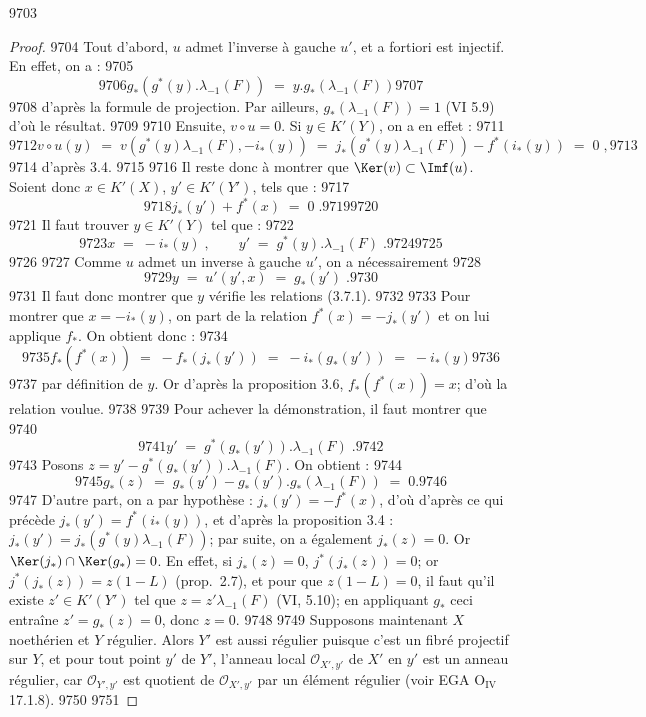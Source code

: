   9703	\begin{proof}
  9704	Tout d'abord, $u$ admet l'inverse à gauche $u'$, et a fortiori est injectif. En effet, on a :
  9705	\[
  9706	g_*(g^*(y).\lambda_{-1}(F)) \; = \; y . g_*(\lambda_{-1}(F))
  9707	\]
  9708	d'après la formule de projection. Par ailleurs, $g_*(\lambda_{-1}(F)) = 1$ (VI 5.9) d'où le résultat.
  9709	
  9710	Ensuite, $v \circ u = 0$. Si $y \in K'(Y)$, on a en effet :
  9711	\[
  9712	v \circ u(y) \; = \; v(g^*(y)\lambda_{-1}(F), -i_*(y)) \; = \; j_*(g^*(y)\lambda_{-1}(F)) - f^*(i_*(y)) \; = \; 0\; ,
  9713	\]
  9714	d'après 3.4.
  9715	
  9716	Il reste donc à montrer que $\Ker(v) \subset \Imf(u)$. Soient donc $x \in K'(X)$, $y' \in K'(Y')$, tels que :
  9717	\[
  9718	j_*(y') + f^*(x) \; = \; 0\; .
  9719	\tag{*}
  9720	\]
  9721	Il faut trouver $y \in K'(Y)$ tel que :
  9722	\[
  9723	x \; = \; -i_*(y)\; , \qquad y' \; = \; g^*(y).\lambda_{-1}(F)\; .
  9724	\tag{3.7.1}
  9725	\]
  9726	
  9727	Comme $u$ admet un inverse à gauche $u'$, on a nécessairement
  9728	\[
  9729	y \; = \; u'(y', x) \; = \; g_*(y')\; .
  9730	\]
  9731	Il faut donc montrer que $y$ vérifie les relations (3.7.1).
  9732	
  9733	Pour montrer que $x = -i_*(y)$, on part de la relation $f^*(x) = -j_*(y')$ et on lui applique $f_*$. On obtient donc :
  9734	\[
  9735	f_*(f^*(x)) \; = \; -f_*(j_*(y')) \; = \; -i_*(g_*(y')) \; = \; -i_*(y)
  9736	\]
  9737	par définition de $y$. Or d'après la proposition 3.6, $f_*(f^*(x)) = x$; d'où la relation voulue.
  9738	
  9739	Pour achever la démonstration, il faut montrer que
  9740	\[
  9741	y' \; = \; g^*(g_*(y')).\lambda_{-1}(F)\; .
  9742	\]
  9743	Posons $z = y' - g^*(g_*(y')).\lambda_{-1}(F)$. On obtient :
  9744	\[
  9745	g_*(z) \; = \; g_*(y') - g_*(y').g_*(\lambda_{-1}(F)) \; = \; 0.
  9746	\]
  9747	D'autre part, on a par hypothèse : $j_*(y') = -f^*(x)$, d'où d'après ce qui précède $j_*(y') = f^*(i_*(y))$, et d'après la proposition 3.4 : $j_*(y') = j_*(g^*(y)\lambda_{-1}(F))$; par suite, on a également $j_*(z) = 0$. Or $\Ker(j_*) \cap \Ker(g_*) = 0$. En effet, si $j_*(z) = 0$, $j^*(j_*(z)) = 0$; or $j^*(j_*(z)) = z(1-L)$ (prop.~2.7), et pour que $z(1-L) = 0$, il faut qu'il existe $z' \in K'(Y')$ tel que $z = z'\lambda_{-1}(F)$ (VI, 5.10); en appliquant $g_*$ ceci entraîne $z' = g_*(z) = 0$, donc $z = 0$.
  9748	
  9749	Supposons maintenant $X$ noethérien et $Y$ régulier. Alors $Y'$ est aussi régulier puisque c'est un fibré projectif sur $Y$, et pour tout point $y'$ de $Y'$, l'anneau local $\mathscr{O}_{X',y'}$ de $X'$ en $y'$ est un anneau régulier, car $\mathscr{O}_{Y',y'}$ est quotient de $\mathscr{O}_{X',y'}$ par un élément régulier (voir EGA $\text{O}_{\text{IV}}$ 17.1.8).
  9750	
  9751	\end{proof}
